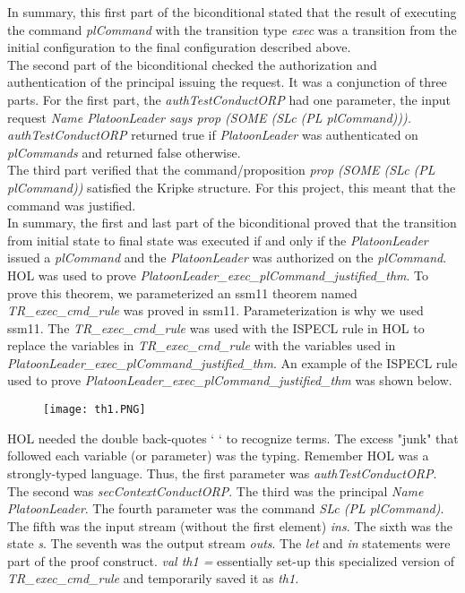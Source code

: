  In summary, this first part of the biconditional stated that the result of executing the command
  \textit{plCommand} with the transition type \textit{exec} was a transition from the initial configuration
  to the final configuration described above.\\
  
 The second part of the biconditional checked the authorization and authentication of the principal
  issuing the request.  It was a conjunction of three parts.  For the first part, the \textit{authTestConductORP}
  had one parameter, the input request \textit{Name PlatoonLeader says prop (SOME (SLc (PL plCommand))).
    authTestConductORP} returned true if \textit{PlatoonLeader} was authenticated on \textit{plCommands}
  and returned false otherwise.\\
  
 The third part verified that the command/proposition \textit{prop (SOME (SLc (PL plCommand))}
 satisfied the Kripke structure.  For this project, this meant that the command was justified.\\
 
 In summary, the first and last part of the biconditional proved that the transition from initial
  state to final state was executed if and only if the \textit{PlatoonLeader} issued a \textit{plCommand}
  and the \textit{PlatoonLeader} was authorized on the \textit{plCommand}.\\
  
 HOL was used to prove \textit{PlatoonLeader_exec_plCommand_justified_thm}.  To prove this theorem,
  we parameterized an ssm11 theorem named \textit{TR_exec_cmd_rule} was proved in ssm11.  Parameterization
  is why we used ssm11.  The \textit{TR_exec_cmd_rule}  was used with the ISPECL rule in HOL to replace the
  variables in \textit{TR_exec_cmd_rule}  with the variables used in \textit{PlatoonLeader_exec_plCommand_justified_thm}.
  An example of the ISPECL rule used to prove \textit{PlatoonLeader_exec_plCommand_justified_thm} was shown below.\\
  
  \begin{figure}[h]
  \centering
  \texttt{[image: th1.PNG]}
\end{figure}

 HOL needed the double back-quotes ` ` to recognize terms.  The excess "junk" that followed
  each variable (or parameter) was the typing.  Remember HOL was a strongly-typed language.  Thus,
  the first parameter was \textit{authTestConductORP}.  The second was \textit{secContextConductORP}.
  The third was the principal \textit{Name PlatoonLeader}.  The fourth parameter was the command
  \textit{SLc (PL plCommand)}.  The fifth was the input stream (without the first element)
  \textit{ins}.  The sixth was the state \textit{s}.  The seventh was the output stream
  \textit{outs}.  The \textit{let} and \textit{in} statements were part of the proof construct.
  \textit{val th1 =} essentially set-up this specialized version of \textit{TR_exec_cmd_rule} and
  temporarily saved it as \textit{th1}.\\
  
